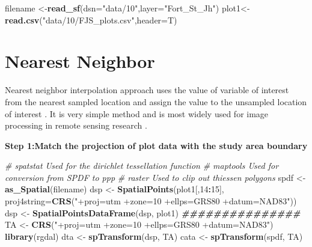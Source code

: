 \documentclass[
]{book}
\newenvironment{Shaded}{\begin{snugshade}}{\end{snugshade}}
\newcommand{\AttributeTok}[1]{\textcolor[rgb]{0.13,0.29,0.53}{#1}}
\newcommand{\CommentTok}[1]{\textcolor[rgb]{0.56,0.35,0.01}{\textit{#1}}}
\newcommand{\DecValTok}[1]{\textcolor[rgb]{0.00,0.00,0.81}{#1}}
\newcommand{\DocumentationTok}[1]{\textcolor[rgb]{0.56,0.35,0.01}{\textbf{\textit{#1}}}}
\newcommand{\FunctionTok}[1]{\textcolor[rgb]{0.13,0.29,0.53}{\textbf{#1}}}
\newcommand{\NormalTok}[1]{#1}
\newcommand{\OtherTok}[1]{\textcolor[rgb]{0.56,0.35,0.01}{#1}}
\newcommand{\SpecialCharTok}[1]{\textcolor[rgb]{0.81,0.36,0.00}{\textbf{#1}}}
\newcommand{\StringTok}[1]{\textcolor[rgb]{0.31,0.60,0.02}{#1}}
\begin{document}
\begin{Shaded}
\begin{Highlighting}[]
\NormalTok{filename }\OtherTok{\textless{}{-}}\FunctionTok{read\_sf}\NormalTok{(}\AttributeTok{dsn=}\StringTok{"data/10"}\NormalTok{,}\AttributeTok{layer=}\StringTok{"Fort\_St\_Jh"}\NormalTok{)}
\NormalTok{plot1}\OtherTok{\textless{}{-}} \FunctionTok{read.csv}\NormalTok{(}\StringTok{"data/10/FJS\_plots.csv"}\NormalTok{,}\AttributeTok{header=}\NormalTok{T)}
\end{Highlighting}
\end{Shaded}

\hypertarget{nearest-neighbor}{%
\section{Nearest Neighbor}\label{nearest-neighbor}}

Nearest neighbor interpolation approach uses the value of variable of interest from the nearest sampled location and assign the value to the unsampled location of interest \citep{titus_comparison_2013}. It is very simple method and is most widely used for image processing in remote sensing research \citep{titus_comparison_2013}.

\textbf{Step 1:Match the projection of plot data with the study area boundary}

\begin{Shaded}
\begin{Highlighting}[]
\CommentTok{\# spatstat Used for the dirichlet tessellation function}
\CommentTok{\# maptools Used for conversion from SPDF to ppp}
\CommentTok{\# raster Used to clip out thiessen polygons}
\NormalTok{spdf }\OtherTok{\textless{}{-}} \FunctionTok{as\_Spatial}\NormalTok{(filename)}
\NormalTok{dsp }\OtherTok{\textless{}{-}} \FunctionTok{SpatialPoints}\NormalTok{(plot1[,}\DecValTok{14}\SpecialCharTok{:}\DecValTok{15}\NormalTok{], }\AttributeTok{proj4string=}\FunctionTok{CRS}\NormalTok{(}\StringTok{"+proj=utm +zone=10 +ellps=GRS80 +datum=NAD83"}\NormalTok{))}
\NormalTok{dsp }\OtherTok{\textless{}{-}} \FunctionTok{SpatialPointsDataFrame}\NormalTok{(dsp, plot1)}
\DocumentationTok{\#\#\#\#\#\#\#\#\#\#\#\#\#\#\#}
\NormalTok{TA }\OtherTok{\textless{}{-}} \FunctionTok{CRS}\NormalTok{(}\StringTok{"+proj=utm +zone=10 +ellps=GRS80 +datum=NAD83"}\NormalTok{)}
\FunctionTok{library}\NormalTok{(rgdal)}
\NormalTok{dta }\OtherTok{\textless{}{-}} \FunctionTok{spTransform}\NormalTok{(dsp, TA)}
\NormalTok{cata }\OtherTok{\textless{}{-}} \FunctionTok{spTransform}\NormalTok{(spdf, TA)}
\end{Highlighting}
\end{Shaded}
\end{document}
